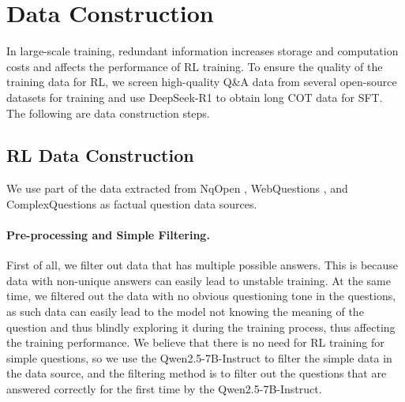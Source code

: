 \section{Data Construction} %

In large-scale training, redundant information increases storage and computation costs and affects the performance of RL training. 
To ensure the quality of the training data for RL, we screen high-quality Q\&A data from several open-source datasets for training and use DeepSeek-R1 to obtain long COT data for SFT. The following are data construction steps.

\subsection{RL Data Construction}
 We use part of the data extracted from NqOpen \cite{kwiatkowski2019natural,lee2019latent}, WebQuestions \citep{berant2013semantic}, and ComplexQuestions \citep{bao2016constraint} as factual question data sources.

\paragraph{Pre-processing and Simple Filtering.}
First of all, we filter out data that has multiple possible answers. 
This is because data with non-unique answers can easily lead to unstable training. 
At the same time, we filtered out the data with no obvious questioning tone in the questions, as such data can easily lead to the model not knowing the meaning of the question and thus blindly exploring it during the training process, thus affecting the training performance. 
We believe that there is no need for RL training for simple questions, so we use the Qwen2.5-7B-Instruct \citep{qwen2.5} to filter the simple data in the data source, and the filtering method is to filter out the questions that are answered correctly for the first time by the Qwen2.5-7B-Instruct.

